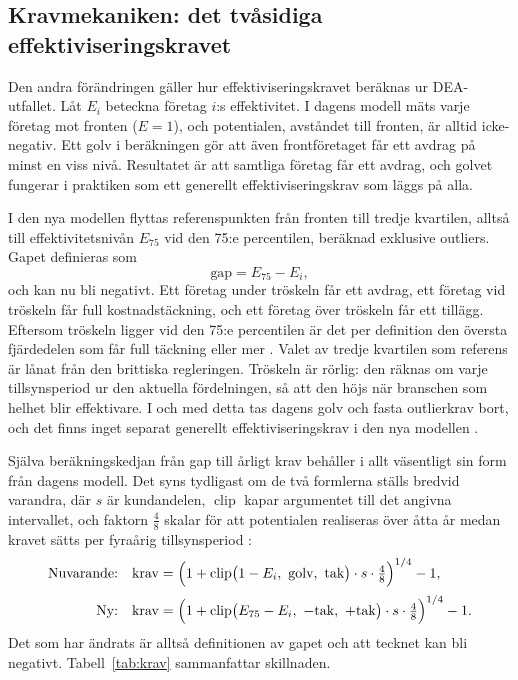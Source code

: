 \documentclass[11pt,a4paper]{article}
\DeclareMathOperator{\clip}{clip}
\begin{document}
\subsection{Kravmekaniken: det tvåsidiga effektiviseringskravet}

Den andra förändringen gäller hur effektiviseringskravet beräknas ur DEA-utfallet. Låt $E_i$
beteckna företag $i$:s effektivitet. I dagens modell mäts varje företag mot fronten ($E = 1$), och
potentialen, avståndet till fronten, är alltid icke-negativ. Ett golv i beräkningen gör att även
frontföretaget får ett avdrag på minst en viss nivå. Resultatet är att samtliga företag får ett
avdrag, och golvet fungerar i praktiken som ett generellt effektiviseringskrav som läggs på alla.

I den nya modellen flyttas referenspunkten från fronten till tredje kvartilen, alltså till
effektivitetsnivån $E_{75}$ vid den 75:e percentilen, beräknad exklusive outliers. Gapet definieras
som
\[
  \text{gap} = E_{75} - E_i,
\]
och kan nu bli negativt. Ett företag under tröskeln får ett avdrag, ett företag vid tröskeln får
full kostnadstäckning, och ett företag över tröskeln får ett tillägg. Eftersom tröskeln ligger vid
den 75:e percentilen är det per definition den översta fjärdedelen som får full täckning eller mer \citep{Ei2026Effektivisering}.
Valet av tredje kvartilen som referens är lånat från den brittiska regleringen. Tröskeln är
rörlig: den räknas om varje tillsynsperiod ur den aktuella fördelningen, så att den höjs när
branschen som helhet blir effektivare. I och med detta tas dagens golv och fasta outlierkrav bort,
och det finns inget separat generellt effektiviseringskrav i den nya modellen \citeyearpar{Ei2026Effektivisering}.

Själva beräkningskedjan från gap till årligt krav behåller i allt väsentligt sin form från dagens
modell. Det syns tydligast om de två formlerna ställs bredvid varandra, där $s$ är kundandelen,
$\clip$ kapar argumentet till det angivna intervallet, och faktorn $\tfrac{4}{8}$ skalar för att
potentialen realiseras över åtta år medan kravet sätts per fyraårig tillsynsperiod \citeyearpar{Ei2026Effektivisering}:
\begin{align*}
  \text{Nuvarande:} \quad
    & \text{krav} = \Bigl(1 + \clip\bigl(1 - E_i,\ \text{golv},\ \text{tak}\bigr)
      \cdot s \cdot \tfrac{4}{8}\Bigr)^{1/4} - 1, \\[2pt]
  \text{Ny:} \quad
    & \text{krav} = \Bigl(1 + \clip\bigl(E_{75} - E_i,\ -\text{tak},\ +\text{tak}\bigr)
      \cdot s \cdot \tfrac{4}{8}\Bigr)^{1/4} - 1.
\end{align*}
Det som har ändrats är alltså definitionen av gapet och att tecknet kan bli negativt. Tabell~\ref{tab:krav}
sammanfattar skillnaden.
\end{document}
